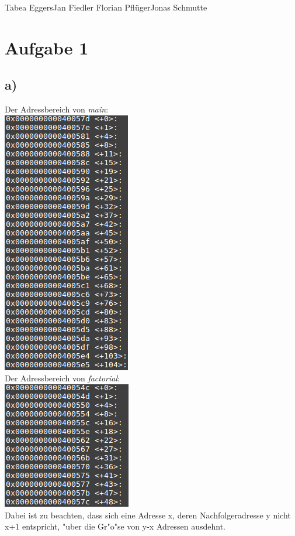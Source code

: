 \documentclass{ti2}
\begin{document}
%
                {Tabea Eggers}{Jan Fiedler}%
                {Florian Pflüger}{Jonas Schmutte}%


\section*{Aufgabe 1}
\subsection*{a)}
Der Adressbereich von \emph{main}:\\
\includegraphics{aufgabe01/main.png}\\

Der Adressbereich von \emph{factorial}:\\
\includegraphics{aufgabe01/factorial.png}\\
Dabei ist zu beachten, dass sich eine Adresse x, deren Nachfolgeradresse y nicht x+1 entspricht, "uber die Gr"o"se von y-x Adressen ausdehnt.\\ 
\end{document}
